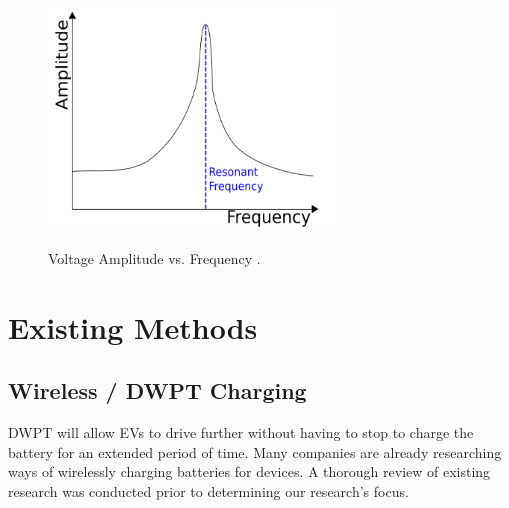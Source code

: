\begin{figure}
    \begin{center}
    \includegraphics[width=3in]{fig3.png}
    \end{center}
    \renewcommand{\baselinestretch}{1}
    \small\normalsize
    \begin{quote}
    \caption[Voltage Amplitude vs. Frequency]{Voltage Amplitude vs. Frequency \cite{noauthor_resonant_nodate}.} \label{fig: f3}
    \end{quote}
\end{figure}

\section{Existing Methods}
\subsection{Wireless / DWPT Charging}
DWPT will allow EVs to drive further without having to stop to charge the battery for an extended period of time. 
Many companies are already researching ways of wirelessly charging batteries for devices. A thorough review of 
existing research was conducted prior to determining our research’s focus.

